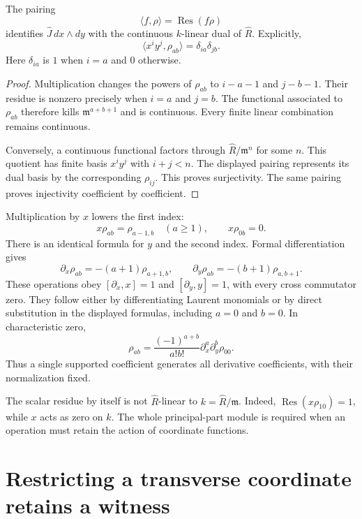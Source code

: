 \begin{proposition}\label{prop:ocr-residue-dual}
The pairing
\[
 \langle f,\rho\rangle=\operatorname{Res}(f\rho)
\]
identifies $\widehat J\,dx\wedge dy$ with the continuous $k$-linear
dual of $\widehat R$. Explicitly,
\[
 \langle x^iy^j,\rho_{ab}\rangle=\delta_{ia}\delta_{jb}.
\]
Here $\delta_{ia}$ is $1$ when $i=a$ and $0$ otherwise.
\end{proposition}

\begin{proof}
Multiplication changes the powers of $\rho_{ab}$ to
$i-a-1$ and $j-b-1$.
Their residue is nonzero precisely when $i=a$ and $j=b$.
The functional associated to $\rho_{ab}$ therefore kills
$\mathfrak m^{a+b+1}$ and is continuous.
Every finite linear combination remains continuous.

Conversely, a continuous functional factors through
$\widehat R/\mathfrak m^n$ for some $n$.
This quotient has finite basis $x^iy^j$ with $i+j<n$.
The displayed pairing represents its dual basis by the corresponding
$\rho_{ij}$. This proves surjectivity.
The same pairing proves injectivity coefficient by coefficient.
\end{proof}

Multiplication by $x$ lowers the first index:
\[
 x\rho_{ab}=\rho_{a-1,b}\quad(a\ge1),\qquad x\rho_{0b}=0.
\]
There is an identical formula for $y$ and the second index.
Formal differentiation gives
\[
 \partial_x\rho_{ab}=-(a+1)\rho_{a+1,b},\qquad
 \partial_y\rho_{ab}=-(b+1)\rho_{a,b+1}.
\]
These operations obey $[\partial_x,x]=1$ and
$[\partial_y,y]=1$, with every cross commutator zero.
They follow either by differentiating Laurent monomials or by direct
substitution in the displayed formulas, including $a=0$ and $b=0$.
In characteristic zero,
\[
 \rho_{ab}=\frac{(-1)^{a+b}}{a!b!}
 \partial_x^a\partial_y^b\rho_{00}.
\]
Thus a single supported coefficient generates all derivative
coefficients, with their normalization fixed.

The scalar residue by itself is not $\widehat R$-linear to
$k=\widehat R/\mathfrak m$.
Indeed, $\operatorname{Res}(x\rho_{10})=1$, while $x$ acts as zero
on $k$. The whole principal-part module is required when an
operation must retain the action of coordinate functions.

\section{Restricting a transverse coordinate retains a witness}

